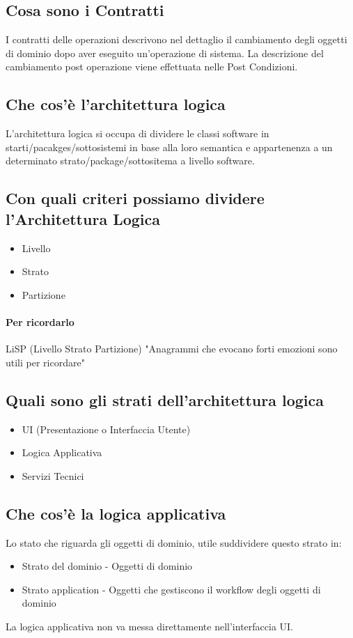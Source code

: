 \documentclass[12pt, a4paper, openany]{book}
\begin{document}
\subsection*{Cosa sono i Contratti}
I contratti delle operazioni descrivono nel dettaglio il cambiamento degli oggetti di dominio
dopo aver eseguito un'operazione di sistema. La descrizione del cambiamento
post operazione viene effettuata nelle Post Condizioni.

\subsection*{Che cos'è l'architettura logica}
L'architettura logica si occupa di dividere le classi software in starti/pacakges/sottosistemi
in base alla loro semantica e appartenenza a un determinato strato/package/sottositema a
livello software.

\subsection*{Con quali criteri possiamo dividere l'Architettura Logica}
\begin{itemize}
    \item Livello
    \item Strato
    \item Partizione
\end{itemize}
\paragraph*{Per ricordarlo}LiSP (Livello Strato Partizione) "Anagrammi che evocano forti
emozioni sono utili per ricordare"
\subsection*{Quali sono gli strati dell'architettura logica}
\begin{itemize}
    \item UI (Presentazione o Interfaccia Utente)
    \item Logica Applicativa
    \item Servizi Tecnici
\end{itemize}

\subsection*{Che cos'è la logica applicativa}
Lo stato che riguarda gli oggetti di dominio, utile suddividere questo strato in:
\begin{itemize}
    \item Strato del dominio - Oggetti di dominio
    \item Strato application - Oggetti che gestiscono il workflow degli oggetti di dominio
\end{itemize}
La logica applicativa non va messa direttamente nell'interfaccia UI.
\end{document}
